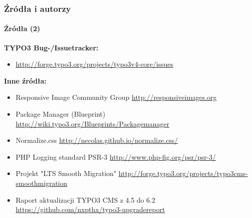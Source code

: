 
\begin{frame}[fragile]
	\frametitle{Źródła i autorzy}
	\framesubtitle{Źródła (2)}

	\textbf{TYPO3 Bug-/Issuetracker:}
		\begin{itemize}\smaller
			\item \url{http://forge.typo3.org/projects/typo3v4-core/issues}
		\end{itemize}

	\textbf{Inne źródła:}
		\begin{itemize}\smaller

			\item Responsive Image Community Group\newline
				\url{http://responsiveimages.org}

			\item Package Manager (Blueprint)\newline
				\url{http://wiki.typo3.org/Blueprints/Packagemanager}

			\item Normalize.css\newline
				\url{http://necolas.github.io/normalize.css/}

			\item PHP Logging standard PSR-3\newline
				\url{http://www.php-fig.org/psr/psr-3/}

			\item Projekt "LTS Smooth Migration"\newline
				\url{http://forge.typo3.org/projects/typo3cms-smoothmigration}

			\item Raport aktualizacji TYPO3 CMS z 4.5 do 6.2 
				\url{https://github.com/nxpthx/typo3-upgradereport}

		\end{itemize}

\end{frame}


